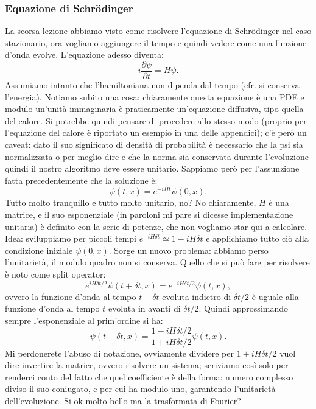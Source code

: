 \documentclass[10pt,a4paper]{article}
\begin{document}
\subsubsection{Equazione di Schrödinger}
La scorsa lezione abbiamo visto come risolvere l'equazione di Schrödinger nel caso stazionario, ora vogliamo aggiungere il tempo e quindi vedere come una funzione d'onda evolve. L'equazione adesso diventa:
\begin{equation}
i \frac{\partial \psi}{\partial t} = H \psi .
\end{equation}
Assumiamo intanto che l'hamiltoniana non dipenda dal tempo (cfr. si conserva l'energia). Notiamo subito una cosa: chiaramente questa equazione è una PDE e modulo un'unità immaginaria è praticamente un'equazione diffusiva, tipo quella del calore. Si potrebbe quindi pensare di procedere allo stesso modo (proprio per l'equazione del calore è riportato un esempio in una delle appendici); c'è però un caveat: dato il suo significato di densità di probabilità è necessario che la psi sia normalizzata o per meglio dire e che la norma sia conservata durante l'evoluzione quindi il nostro algoritmo deve essere unitario. Sappiamo però per l'assunzione fatta precedentemente che la soluzione è:
\begin{equation}
\psi(t, x) = e^{-iHt} \psi(0, x) .
\end{equation}
Tutto molto tranquillo e tutto molto unitario, no? No chiaramente, $H$ è una matrice, e il suo esponenziale (in paroloni mi pare si dicesse implementazione unitaria) è definito con la serie di potenze, che non vogliamo star qui a calcolare. Idea: sviluppiamo per piccoli tempi $e^{-iH \delta t} \simeq 1 - i H \delta t$ e applichiamo tutto ciò alla condizione iniziale $\psi(0, x)$. Sorge un nuovo problema: abbiamo perso l'unitarietà, il modulo quadro non si conserva. Quello che si può fare per risolvere è noto come split operator:
\begin{equation}
e^{iH \delta t/2} \psi(t+\delta t, x) = e^{-iH \delta t/2} \psi(t, x) ,
\end{equation}
ovvero la funzione d'onda al tempo $t+\delta t$ evoluta indietro di $\delta t /2$ è uguale alla funzione d'onda al tempo $t$ evoluta in avanti di $\delta t/2$. Quindi approssimando sempre l'esponenziale al prim'ordine si ha:
\begin{equation}
\psi(t+\delta t, x) = \frac{1-iH \delta t/2}{1 + iH \delta t/2} \psi(t, x) .
\end{equation}
Mi perdonerete l'abuso di notazione, ovviamente dividere per $1+iH \delta t/2$ vuol dire invertire la matrice, ovvero risolvere un sistema; scriviamo così solo per renderci conto del fatto che quel coefficiente è della forma: numero complesso diviso il suo coniugato, e per cui ha modulo uno, garantendo l'unitarietà dell'evoluzione. Si ok molto bello ma la trasformata di Fourier?
\end{document}
